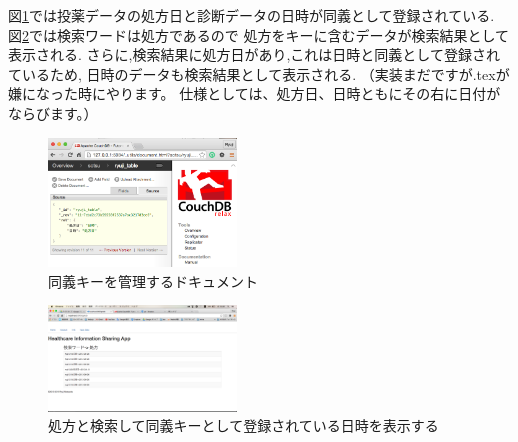 	図\ref{relation}では投薬データの処方日と診断データの日時が同義として登録されている.
	図\ref{relationApp}では検索ワードは処方であるので
	処方をキーに含むデータが検索結果として表示される.
	さらに,検索結果に処方日があり,これは日時と同義として登録されているため,
	日時のデータも検索結果として表示される.
	（実装まだですが.texが嫌になった時にやります。
	仕様としては、処方日、日時ともにその右に日付がならびます。）

	\begin{figure}[htbp]
			\includegraphics[width=5cm, bb=0 0 437 688]{./gazou/relation2.png}
		\caption{同義キーを管理するドキュメント}
		\label{relation}
	\end{figure}

	\begin{figure}[htbp]
			\includegraphics[width=5cm, bb=0 0 437 688]{./gazou/relationApp2.png}
		\caption{処方と検索して同義キーとして登録されている日時を表示する}
		\label{relationApp}
	\end{figure}
